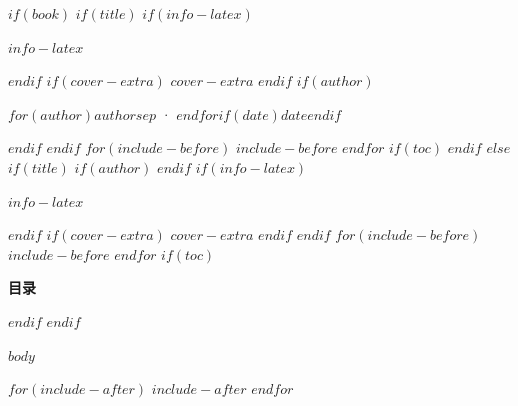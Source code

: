 \documentclass[fontset=none, zihao=$if(zihao)$$zihao$$else$5$endif$, openany, oneside, a4paper]{ctexbook}
\begin{document}
$if(book)$
\frontmatter
$if(title)$
$if(info-latex)$
\begin{lpinfo}
$info-latex$
\end{lpinfo}
$endif$
$if(cover-extra)$
$cover-extra$
$endif$
$if(author)$
\vfill
{\centering\sffamily\color{lpgray}$for(author)$$author$$sep$ · $endfor$$if(date)$\quad$date$$endif$\par}
$endif$
\clearpage
$endif$
$for(include-before)$
$include-before$
$endfor$
$if(toc)$
\tableofcontents
\clearpage
$endif$
\mainmatter
$else$
$if(title)$
$if(author)$
\vspace{4pt}
$endif$
$if(info-latex)$
\begin{lpinfo}
$info-latex$
\end{lpinfo}
$endif$
$if(cover-extra)$
$cover-extra$
$endif$
$endif$
$for(include-before)$
$include-before$
$endfor$
$if(toc)$
{\noindent\sffamily\bfseries\color{primary}\Large 目录\par}\vspace{6pt}
{\makeatletter{}\makeatother}
\vspace{10pt}
$endif$
$endif$

$body$

$for(include-after)$
$include-after$
$endfor$
\end{document}
